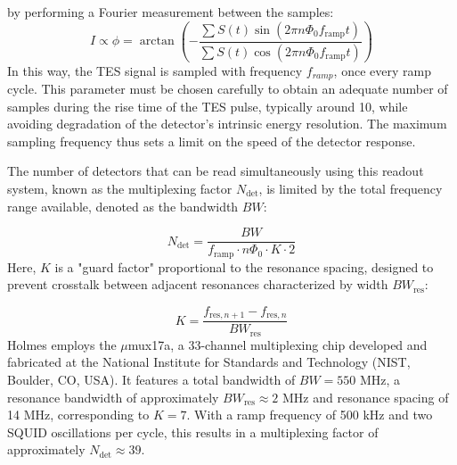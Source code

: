 by performing a Fourier measurement between the samples:
\begin{equation}
I \propto \phi = \arctan\left(- \frac{\sum S(t) \sin(2\pi n\Phi_0 f_{\text{ramp}} t)}{\sum S(t) \cos(2\pi n\Phi_0 f_{\text{ramp}} t)}\right)  
\end{equation}
In this way, the TES signal is sampled with frequency $f_{ramp}$, once every ramp cycle.
This parameter must be chosen carefully to obtain an adequate number of samples during the rise time of the TES pulse,
typically around 10, while avoiding degradation of the detector's intrinsic energy resolution. The maximum sampling
frequency thus sets a limit on the speed of the detector response. 

The number of detectors that can be read simultaneously using this readout system, known as the multiplexing factor
\(N_{\text{det}}\), is limited by the total frequency range available, denoted as the bandwidth \(BW\):

\begin{equation}
N_{\text{det}} = \frac{BW}{f_{\text{ramp}} \cdot n\Phi_0 \cdot K \cdot 2} 
\end{equation}
Here, \(K\) is a "guard factor" proportional to the resonance spacing, designed to prevent crosstalk between adjacent
resonances characterized by width $BW_{\text{res}}$:

\begin{equation}
K = \frac{f_{\text{res}, n+1} - f_{\text{res}, n}}{BW_{\text{res}}}   
\end{equation}
Holmes employs the $\mu$mux17a, a 33-channel multiplexing chip developed and fabricated at the National Institute for
Standards and Technology (NIST, Boulder, CO, USA). It features a total bandwidth of \(BW = 550\) MHz, a resonance
bandwidth of approximately \(BW_{\text{res}} \approx 2\) MHz and resonance spacing of 14 MHz, corresponding to $K=7$.
With a ramp frequency of 500 kHz and two SQUID oscillations per cycle, this results in a multiplexing factor of approximately \(N_{\text{det}} \approx 39\).

